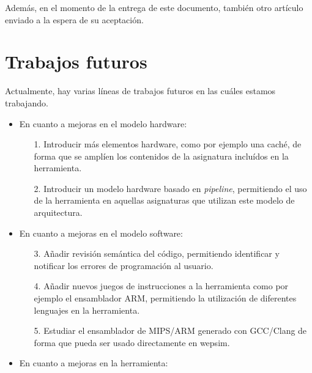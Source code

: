 Además, en el momento de la entrega de este documento, también otro artículo enviado a la espera de su aceptación.

\vspace{1cm}

\section{Trabajos futuros}

Actualmente, hay varias líneas de trabajos futuros en las cuáles estamos trabajando.

\begin{itemize}

\item En cuanto a mejoras en el modelo \gls{hardware}:

\begin{itemize}

\item[1.] Introducir más elementos \gls{hardware}, como por ejemplo una caché, de forma que se amplíen los contenidos de la asignatura incluídos en la herramienta.

\item[2.] Introducir un modelo \gls{hardware} basado en \textit{\gls{pipeline}}, permitiendo el uso de la herramienta en aquellas asignaturas que utilizan este modelo de arquitectura. 

\end{itemize}

\item En cuanto a mejoras en el modelo \gls{software}:

\begin{itemize}

\item[3.] Añadir revisión semántica del código, permitiendo identificar y notificar los errores de programación al usuario.

\item[4.] Añadir nuevos juegos de instrucciones a la herramienta como por ejemplo el \gls{ensamblador} ARM, permitiendo la utilización de diferentes lenguajes en la herramienta.

\item[5.] Estudiar el \gls{ensamblador} de MIPS/ARM generado con GCC/Clang de forma que pueda ser usado directamente en \acrshort{wepsim}.

\end{itemize}

\item En cuanto a mejoras en la herramienta:


\end{itemize}

